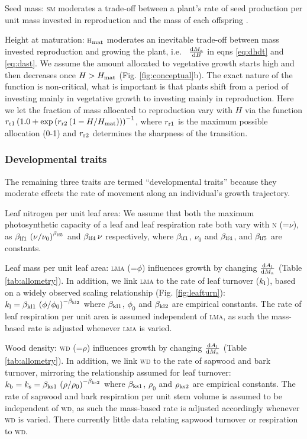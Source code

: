 \documentclass[9pt,twocolumn,twoside,lineno]{pnas-new}
\newcommand{\lma}{\textsc{lma}}
\newcommand{\wood}{\textsc{wd}}
\newcommand{\seed}{\textsc{sm}}
\newcommand{\hmat}{\textsc{h}$_{\rm mat}$}
\newcommand{\nitrogen}{\textsc{n}}
\begin{document}
Seed mass: {\seed} moderates a trade-off between a plant's rate of seed production per unit mass invested in reproduction and the mass of each offspring  \citep{Moles-2006}.

Height at maturation: {\hmat} moderates an inevitable trade-off between mass invested reproduction and growing the plant, i.e.~ $\frac{{\rm d}M_{\rm a}}{{\rm d}B}$ in eqns \ref{eq:dhdt} and \ref{eq:dast}. We assume the amount allocated to vegetative growth starts high and then decreases once $H > H_{{\rm mat}}$  (Fig. \ref{fig:conceptual}b). The exact nature of the function is non-critical, what is important is that plants shift from a period of investing mainly in vegetative growth to investing mainly in reproduction. Here we let the fraction of mass allocated to reproduction vary with $H$ via the function $r_{\rm r1}  \left(1.0 + \exp\left(r_{\rm r2} \left(1 - H / H_{{\rm mat}}\right)\right)\right)^{-1}$, where $r_{\rm r1}$ is the maximum possible allocation (0-1) and $r_{\rm r2}$ determines the sharpness of the transition. 

\subsubsection*{Developmental traits} The remaining three traits are termed ``developmental traits'' because they moderate effects the rate of movement along an individual's growth trajectory. 

Leaf nitrogen per unit leaf area: We assume that both the maximum photosynthetic capacity of a leaf and leaf respiration rate both vary with {\nitrogen} (=$\nu$), as $\beta_{{\rm lf1}} \, \left(\nu / \nu_0 \right)^{\beta_{{\rm lf5}}}$ and $\beta_{{\rm lf4}}\, \nu$ respectively, where $\beta_{{\rm lf1}}$, $\nu_0$ and $\beta_{{\rm lf4}}$, and $\beta_{{\rm lf5}}$ are constants.

Leaf mass per unit leaf area: {\lma} (=$\phi$) influences growth by changing $\frac{{\rm d}A_{\rm l}}{{\rm d}M_{\rm a}}$ (Table \ref{tab:allometry}). In addition, we link {\lma} to the rate of leaf turnover ($k_{\rm l}$), based on a widely observed scaling relationship \citep{Wright-2004} (Fig. \ref{fig:leafturn}): $k_{\rm l} = \beta_{{\rm kl1}} \, \left(\phi/\phi_0\right)^{-\beta_{{\rm kl2}}}$ where $\beta_{{\rm kl1}}$, $\phi_0$ and $\beta_{{\rm kl2}}$ are empirical constants. The rate of leaf respiration per unit area is assumed independent of {\lma}\citep{Wright-2004}, as such the mass-based rate is adjusted whenever {\lma} is varied.

Wood density: {\wood} (=$\rho$) influences growth by changing $\frac{{\rm d}A_{\rm l}}{{\rm d}M_{\rm a}}$ (Table \ref{tab:allometry}). In addition, we link {\wood} to the rate of sapwood and bark turnover, mirroring the relationship assumed for leaf turnover: $k_{\rm b} = k_{\rm s} = \beta_{{\rm ks1}} \, \left(\rho / \rho_0\right)^{-\beta_{{\rm ks2}}}$ where $\beta_{{\rm ks1}}$, $\rho_0$ and $\rho_{{\rm ks2}}$ are empirical constants. The rate of sapwood and bark respiration per unit stem volume is assumed to be independent of {\wood}, as such the mass-based rate is adjusted accordingly whenever {\wood} is varied. There currently little data relating sapwood turnover or respiration to {\wood}.
\end{document}
